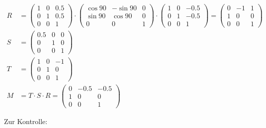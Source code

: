 \documentclass[a4paper]{scrartcl}
\begin{document}
\begin{align}
    R &= \begin{pmatrix}1 & 0 & 0.5\\0 & 1 & 0.5\\0 & 0 & 1\end{pmatrix} \cdot
         \begin{pmatrix}\cos 90 & -\sin 90 & 0\\\sin 90 & \cos 90 & 0\\0 & 0 & 1\end{pmatrix} \cdot
         \begin{pmatrix}1 & 0 & -0.5\\0 & 1 & -0.5\\0 & 0 & 1\end{pmatrix}
       = \begin{pmatrix}0 & -1 & 1\\1 & 0 & 0\\0 & 0 & 1\end{pmatrix}\\
    S &= \begin{pmatrix}0.5 & 0 & 0\\0 & 1 & 0\\0 & 0 & 1\end{pmatrix}\\
    T &= \begin{pmatrix}1 & 0 & -1\\0 & 1 & 0\\0 & 0 & 1\end{pmatrix}\\
    M &= T \cdot S \cdot R
       = \begin{pmatrix}0 & -0.5 & -0.5\\1 & 0 & 0\\0 & 0 & 1\end{pmatrix}
\end{align}

Zur Kontrolle:
\end{document}
